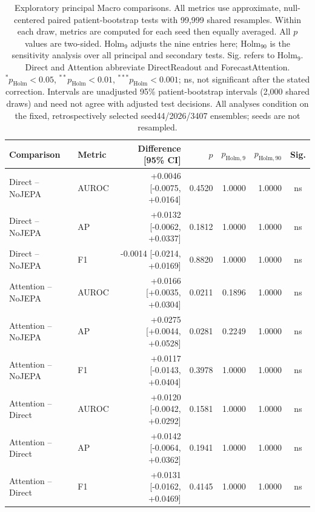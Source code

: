\begin{table}[t]
\centering
\small
\caption{Exploratory principal Macro comparisons. All metrics use approximate, null-centered paired patient-bootstrap tests with 99,999 shared resamples. Within each draw, metrics are computed for each seed then equally averaged. All $p$ values are two-sided. Holm$_9$ adjusts the nine entries here; Holm$_{90}$ is the sensitivity analysis over all principal and secondary tests. Sig. refers to Holm$_9$. Direct and Attention abbreviate DirectReadout and ForecastAttention. $^{*}p_{\mathrm{Holm}}<0.05$, $^{**}p_{\mathrm{Holm}}<0.01$, $^{***}p_{\mathrm{Holm}}<0.001$; ns, not significant after the stated correction. Intervals are unadjusted 95\% patient-bootstrap intervals (2,000 shared draws) and need not agree with adjusted test decisions. All analyses condition on the fixed, retrospectively selected seed44/2026/3407 ensembles; seeds are not resampled.}
\label{tab:bootstrap}
\begin{tabular}{llrrrrc}
\toprule
Comparison & Metric & Difference [95\% CI] & $p$ & $p_{\mathrm{Holm},9}$ & $p_{\mathrm{Holm},90}$ & Sig. \\
\midrule
Direct -- NoJEPA & AUROC & +0.0046 [-0.0075, +0.0164] & 0.4520 & 1.0000 & 1.0000 & ns \\
Direct -- NoJEPA & AP & +0.0132 [-0.0062, +0.0337] & 0.1812 & 1.0000 & 1.0000 & ns \\
Direct -- NoJEPA & F1 & -0.0014 [-0.0214, +0.0169] & 0.8820 & 1.0000 & 1.0000 & ns \\
Attention -- NoJEPA & AUROC & +0.0166 [+0.0035, +0.0304] & 0.0211 & 0.1896 & 1.0000 & ns \\
Attention -- NoJEPA & AP & +0.0275 [+0.0044, +0.0528] & 0.0281 & 0.2249 & 1.0000 & ns \\
Attention -- NoJEPA & F1 & +0.0117 [-0.0143, +0.0404] & 0.3978 & 1.0000 & 1.0000 & ns \\
Attention -- Direct & AUROC & +0.0120 [-0.0042, +0.0292] & 0.1581 & 1.0000 & 1.0000 & ns \\
Attention -- Direct & AP & +0.0142 [-0.0064, +0.0362] & 0.1941 & 1.0000 & 1.0000 & ns \\
Attention -- Direct & F1 & +0.0131 [-0.0162, +0.0469] & 0.4145 & 1.0000 & 1.0000 & ns \\
\bottomrule
\end{tabular}
\end{table}
